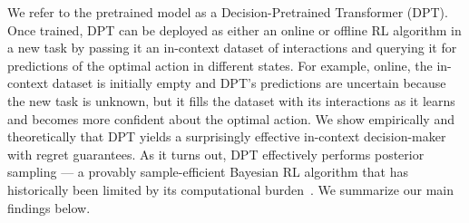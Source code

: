 \documentclass{article}
\begin{document}
We refer to the pretrained model as a Decision-Pretrained Transformer (DPT). Once trained, DPT can be deployed as either an online or offline RL algorithm in a new task by passing it an in-context dataset of interactions and querying it for predictions of the optimal action in different states. For example, online, the in-context dataset is initially empty and DPT's predictions are uncertain because the new task is unknown, but it fills the dataset with its interactions as it learns and becomes more confident about the optimal action. We show empirically and theoretically that DPT yields a surprisingly effective in-context decision-maker with regret guarantees. As it turns out, DPT effectively performs posterior sampling --- a provably sample-efficient Bayesian RL algorithm that has historically been limited by its computational burden~\citep{osband2013more}. We summarize our main findings below.
\end{document}
